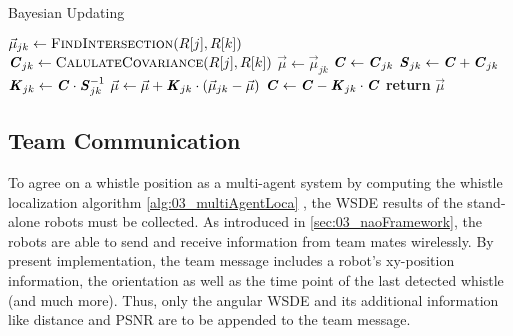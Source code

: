 \begin{algorithm}[H]
    \caption{Bayesian Updating}\label{alg:03_multiAgentLoca}
    \begin{algorithmic}[1]
                    \State $\vec{\mu}_{jk} \gets \Call{FindIntersection}{R[j], R[k]}$
                    \State $\textbf{\textit{C}}_{jk} \gets \Call{CalulateCovariance}{R[j], R[k]}$
                        \State $\vec{\mu} \gets \vec{\mu}_{jk}$
                        \State $\textbf{\textit{C}} \gets \textbf{\textit{C}}_{jk}$
                        \State $\textbf{\textit{S}}_{jk} \gets \textbf{\textit{C}} + \textbf{\textit{C}}_{jk}$
                        \State $\textbf{\textit{K}}_{jk} \gets \textbf{\textit{C}} \cdot \textbf{\textit{S}}_{jk}^{-1}$
                        \State $\vec{\mu} \gets \vec{\mu} + \textbf{\textit{K}}_{jk} \cdot (\vec{\mu}_{jk} - \vec{\mu})$
                        \State $\textbf{\textit{C}} \gets \textbf{\textit{C}} - \textbf{\textit{K}}_{jk} \cdot \textbf{\textit{C}}$
                    \EndIf
                \EndFor
            \EndFor
            \State \textbf{return} $\vec{\mu}$
        \EndProcedure\vspace{12pt}
    \end{algorithmic}
\end{algorithm}

\subsection{Team Communication}
\label{subsec:03_teamCommunication}

To agree on a whistle position as a multi-agent system by computing the whistle
localization algorithm \cref{alg:03_multiAgentLoca} , the \ac{WSDE} results of the
stand-alone robots must be collected.
As introduced in \cref{sec:03_naoFramework}, the robots are able to send and receive
information from team mates wirelessly.
By present implementation, the team message includes a robot's xy-position information,
the orientation as well as the time point of the last detected whistle  (and much more).
Thus, only the angular \ac{WSDE} and its additional information like distance and \ac{PSNR}
are to be appended to the team message.

